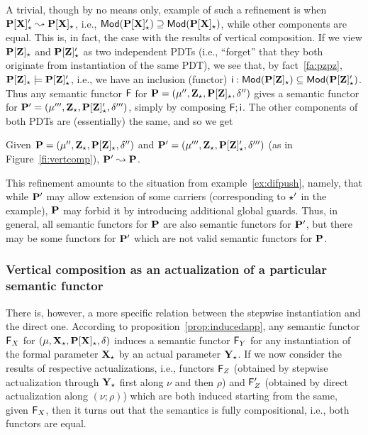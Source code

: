 A trivial, though by no means only, example of such a refinement is when
$\thr{P[X]'_\cons}\leadsto\thr{P[X]_\cons}$, i.e.,
$\Mod(\thr{P[X]'_\cons})\supseteq \Mod(\thr{P[X]_\cons})$, while other
components are equal. This is, in fact, the case with the results of vertical
composition. If we view $\thr{P[Z]_\cons}$ and $\thr{P[Z]'_\cons}$ as two
independent PDTs (i.e., ``forget'' that they both originate from instantiation
of the same PDT), we see that, 
by fact~\ref{fa:pzpz}, $\thr{P[Z]_\cons}\models
\thr{P[Z]'_\cons}$, i.e., we have an inclusion (functor)
$\fu i:\Mod(\thr{P[Z]_\cons})\subseteq\Mod(\thr{P[Z]'_\cons})$. 
Thus any semantic functor $\fu F$ for $\thr P= \pdtsp{\mu''}{\delta''}{\thr
Z_\cons}{\thr{P[Z]_\cons}}$ 
gives a semantic functor for $\thr P'= \pdtsp{\mu'''}{\delta'''}{\thr
Z_\cons}{\thr{P[Z]'_\cons}}$, simply 
by composing $\comp{\fu F}{\fu i}$.
The other components of both PDTs are (essentially) the same, and so we get
%
\begin{fact}
Given $\thr P= \pdtsp{\mu''}{\delta''}{\thr
Z_\cons}{\thr{P[Z]_\cons}}$ and  $\thr P'= \pdtsp{\mu'''}{\delta'''}{\thr
Z_\cons}{\thr{P[Z]'_\cons}}$ (as in Figure~\ref{fi:vertcomp}), $\thr P'\leadsto \thr P$.
\end{fact}
%
This refinement amounts to the situation from
example~\ref{ex:difpush}, namely, that while $\thr P'$ may allow extension of
some carriers (corresponding to $\cons'$ in the example), $\thr P$ may forbid
it by introducing additional global guards. Thus, in general, all semantic
functors for $\thr P$ are also semantic functors for $\thr P'$, but there may
be some functors for $\thr P'$ which are not valid semantic functors for
$\thr P$.

\subsubsection{Vertical composition as an actualization of a particular semantic
functor}
There is, however, a more specific relation between the stepwise
instantiation and the direct one. According to
proposition~\ref{prop:inducedapp}, any semantic functor $\fu F_X$ for $\pdt$
induces a semantic functor $\fu F_Y$ for any instantiation of the formal
parameter $\thr X_\cons$ by an actual parameter $\thr Y_\cons$. 
If we now consider the results of respective actualizations, i.e., functors
$\fu F_Z$ (obtained by stepwise actualization through $\thr Y_\cons$ first
along $\nu$ and then $\rho$) and
$\fu F'_Z$ (obtained by direct actualization along $(\nu;\rho)$) which are
both induced starting from the same, given $\fu F_X$, then it turns out that
the semantics is fully compositional, i.e., both functors are equal.


